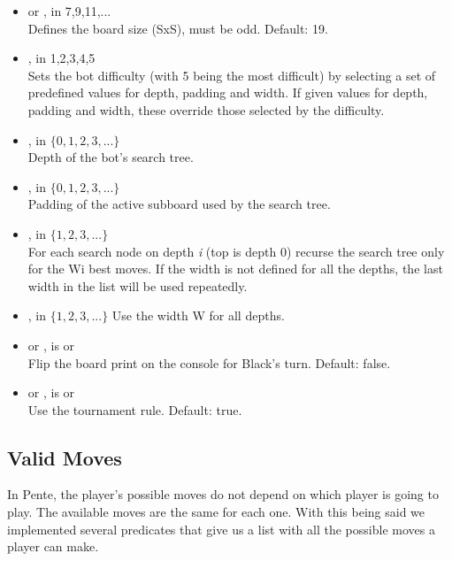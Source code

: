 \documentclass[12pt,a4paper,notitlepage]{article}
\begin{document}
\begin{itemize}
	\item {} or ,  in {7,9,11,...}\\
	Defines the board size (SxS), must be odd.
	Default: 19.
	\item {},  in {1,2,3,4,5}\\
	Sets the bot difficulty (with 5 being the most
	difficult) by selecting a set of predefined values
	for depth, padding and width. If given values for
	depth, padding and width, these override those selected
	by the difficulty.
	\item {},  in $\{0,1,2,3,...\}$\\
	Depth of the bot's search tree.
	\item {},  in $\{0,1,2,3,...\}$\\
	Padding of the active subboard used by the search tree.
	\item {},  in $\{1,2,3,...\}$\\
	For each search node on depth \textit{i} (top is depth 0)
	recurse the search tree only for the Wi best moves.
	If the width is not defined for all the depths, the
	last width in the list will be used repeatedly.
	\item {},  in $\{1,2,3,...\}$
	Use the width W for all depths.
	\item {} or ,  is  or \\
	Flip the board print on the console for Black's turn.
	Default: false.
	\item {} or ,  is  or \\
	Use the tournament rule.
	Default: true.
\end{itemize}

\subsection{Valid Moves}
\label{subsec:validmoves}

In Pente, the player's possible moves do not depend on which player is going to play. The available moves are the same for each one.
With this being said we implemented several predicates that give us a list with all the possible moves a player can make.
\end{document}

